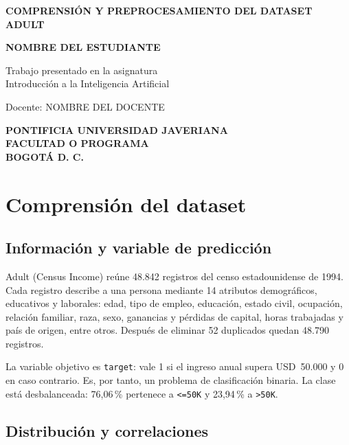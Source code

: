 \documentclass[12pt,letterpaper,oneside]{article}
\begin{document}
\begin{titlepage}
    \centering
    \thispagestyle{empty}
    \vspace*{1cm}
    {\bfseries COMPRENSIÓN Y PREPROCESAMIENTO DEL DATASET ADULT\par}
    \vfill
    {\bfseries NOMBRE DEL ESTUDIANTE\par}
    \vfill
    {Trabajo presentado en la asignatura\\
    Introducción a la Inteligencia Artificial\par}
    \vspace{1cm}
    {Docente: NOMBRE DEL DOCENTE\par}
    \vfill
    {\bfseries PONTIFICIA UNIVERSIDAD JAVERIANA\\
    FACULTAD O PROGRAMA\\
    BOGOTÁ D. C.\\
    \the\year\par}
\end{titlepage}

\setcounter{page}{2}
\tableofcontents
\clearpage

\section{Comprensión del dataset}

\subsection{Información y variable de predicción}

Adult (Census Income) reúne 48.842 registros del censo estadounidense de 1994. Cada registro describe a una persona mediante 14 atributos demográficos, educativos y laborales: edad, tipo de empleo, educación, estado civil, ocupación, relación familiar, raza, sexo, ganancias y pérdidas de capital, horas trabajadas y país de origen, entre otros. Después de eliminar 52 duplicados quedan 48.790 registros.

La variable objetivo es \texttt{target}: vale 1 si el ingreso anual supera USD~50.000 y 0 en caso contrario. Es, por tanto, un problema de clasificación binaria. La clase está desbalanceada: 76,06\,\% pertenece a \texttt{<=50K} y 23,94\,\% a \texttt{>50K}.

\subsection{Distribución y correlaciones}
\end{document}
